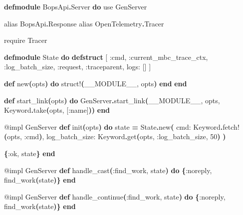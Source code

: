 \documentclass[11pt,a4paper,greek,twoside]{template-xe}
\newenvironment{Shaded}{\begin{english}\begin{snugshade}}{\end{snugshade}\end{english}}
\newcommand{\ConstantTok}[1]{\textcolor[rgb]{0.56,0.35,0.01}{#1}}
\newcommand{\DecValTok}[1]{\textcolor[rgb]{0.00,0.00,0.81}{#1}}
\newcommand{\FunctionTok}[1]{\textcolor[rgb]{0.13,0.29,0.53}{\textbf{#1}}}
\newcommand{\ImportTok}[1]{#1}
\newcommand{\KeywordTok}[1]{\textcolor[rgb]{0.13,0.29,0.53}{\textbf{#1}}}
\newcommand{\NormalTok}[1]{#1}
\newcommand{\OperatorTok}[1]{\textcolor[rgb]{0.81,0.36,0.00}{\textbf{#1}}}
\newcommand{\OtherTok}[1]{\textcolor[rgb]{0.56,0.35,0.01}{#1}}
\newcommand{\VariableTok}[1]{\textcolor[rgb]{0.00,0.00,0.00}{#1}}
\begin{document}
\begin{Shaded}
\begin{Highlighting}[]
\KeywordTok{defmodule} \ConstantTok{BopsApi}\OperatorTok{.}\ConstantTok{Server} \KeywordTok{do}
  \ImportTok{use} \ConstantTok{GenServer}

  \ImportTok{alias} \ConstantTok{BopsApi}\OperatorTok{.}\ConstantTok{Response}
  \ImportTok{alias} \ConstantTok{OpenTelemetry}\OperatorTok{.}\ConstantTok{Tracer}

  \ImportTok{require} \ConstantTok{Tracer}

  \KeywordTok{defmodule} \ConstantTok{State} \KeywordTok{do}
    \KeywordTok{defstruct} \OtherTok{[}
      \VariableTok{:cmd}\NormalTok{,}
      \VariableTok{:current\_mbc\_trace\_ctx}\NormalTok{,}
      \VariableTok{:log\_batch\_size}\NormalTok{,}
      \VariableTok{:request}\NormalTok{,}
      \VariableTok{:traceparent}\NormalTok{,}
      \VariableTok{logs:} \OtherTok{[]}
    \OtherTok{]}

    \KeywordTok{def}\NormalTok{ new}\FunctionTok{(}\NormalTok{opts}\FunctionTok{)} \KeywordTok{do}
\NormalTok{      struct!}\FunctionTok{(}\ConstantTok{\_\_MODULE\_\_}\NormalTok{, opts}\FunctionTok{)}
    \KeywordTok{end}
  \KeywordTok{end}

  \KeywordTok{def}\NormalTok{ start\_link}\FunctionTok{(}\NormalTok{opts}\FunctionTok{)} \KeywordTok{do}
    \ConstantTok{GenServer}\OperatorTok{.}\NormalTok{start\_link}\FunctionTok{(}\ConstantTok{\_\_MODULE\_\_}\NormalTok{, opts, }\ConstantTok{Keyword}\OperatorTok{.}\NormalTok{take}\FunctionTok{(}\NormalTok{opts, }\OtherTok{[}\VariableTok{:name}\OtherTok{]}\FunctionTok{))}
  \KeywordTok{end}

  \OtherTok{@impl} \ConstantTok{GenServer}
  \KeywordTok{def}\NormalTok{ init}\FunctionTok{(}\NormalTok{opts}\FunctionTok{)} \KeywordTok{do}
\NormalTok{    state }\OperatorTok{=}
      \ConstantTok{State}\OperatorTok{.}\NormalTok{new}\FunctionTok{(}
        \VariableTok{cmd:} \ConstantTok{Keyword}\OperatorTok{.}\NormalTok{fetch!}\FunctionTok{(}\NormalTok{opts, }\VariableTok{:cmd}\FunctionTok{)}\NormalTok{,}
        \VariableTok{log\_batch\_size:} \ConstantTok{Keyword}\OperatorTok{.}\NormalTok{get}\FunctionTok{(}\NormalTok{opts, }\VariableTok{:log\_batch\_size}\NormalTok{, }\DecValTok{50}\FunctionTok{)}
      \FunctionTok{)}

    \FunctionTok{\{}\VariableTok{:ok}\NormalTok{, state}\FunctionTok{\}}
  \KeywordTok{end}

  \OtherTok{@impl} \ConstantTok{GenServer}
  \KeywordTok{def}\NormalTok{ handle\_cast}\FunctionTok{(}\VariableTok{:find\_work}\NormalTok{, state}\FunctionTok{)} \KeywordTok{do}
    \FunctionTok{\{}\VariableTok{:noreply}\NormalTok{, find\_work}\FunctionTok{(}\NormalTok{state}\FunctionTok{)\}}
  \KeywordTok{end}

  \OtherTok{@impl} \ConstantTok{GenServer}
  \KeywordTok{def}\NormalTok{ handle\_continue}\FunctionTok{(}\VariableTok{:find\_work}\NormalTok{, state}\FunctionTok{)} \KeywordTok{do}
    \FunctionTok{\{}\VariableTok{:noreply}\NormalTok{, find\_work}\FunctionTok{(}\NormalTok{state}\FunctionTok{)\}}
  \KeywordTok{end}
\end{Highlighting}
\end{Shaded}
\end{document}
